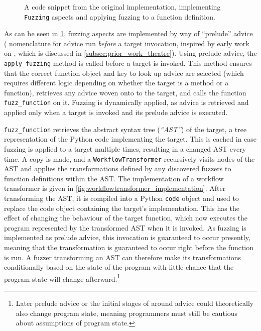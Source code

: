 \begin{figure}[hp]
    \centering
    
    \caption{A code snippet from the original \pdsf implementation, implementing
    \lstinline{Fuzzing} aspects and applying fuzzing to a function definition.}
    \label{fig:v1_pdsf_fuzzing_impl_codesnippet}
\end{figure}

As can be seen in \cref{fig:v1_pdsf_fuzzing_impl_codesnippet}, fuzzing aspects
are implemented by way of ``prelude'' advice (\pdsf{} nomenclature for advice
run \emph{before} a target invocation, inspired by early work on \theatreag{},
which is discussed in \cref{subsec:prior_work_theatre}). Using prelude advice,
the \lstinline{apply_fuzzing} method is called before a target is invoked. This
method ensures that the correct function object and key to look up advice are
selected (which requires different logic depending on whether the target is a
method or a function), retrieves any advice woven onto to the target, and calls
the function \lstinline{fuzz_function} on it. Fuzzing is dynamically applied, as
advice is retrieved and applied only when a target is invoked and its prelude
advice is executed.

\lstinline{fuzz_function} retrieves the abstract syntax tree
(\emph{``AST''}) of the target, a tree representation of the Python code
implementing the target. This is cached in case fuzzing is applied to a target
multiple times, resulting in a changed AST every time. A copy is made, and a
\lstinline{WorkflowTransformer} recursively visits nodes of the AST and applies
the transformations defined by any discovered fuzzers to function definitions
within the AST. The implementation of a workflow transformer is given in
\cref{fig:workflowtransformer_implementation}. After transforming the AST, it is
compiled into a Python \lstinline{code} object and used to replace the code
object containing the target's implementation. This has the effect of changing
the behaviour of the target function, which now executes the program represented
by the transformed AST when it is invoked. As fuzzing is implemented as prelude
advice, this invocation is guaranteed to occur presently, meaning that the
transformation is guaranteed to occur right before the function is run. A fuzzer
transforming an AST can therefore make its transformations conditionally based
on the state of the program with little chance that the program state will
change afterward.\footnote{Later prelude advice or the initial stages of around
advice could theoretically also change program state, meaning programmers must
still be cautious about assumptions of program state.}

